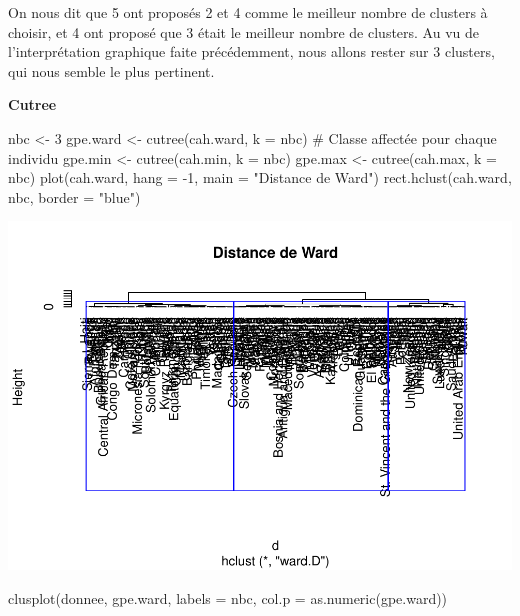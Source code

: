 \documentclass[
]{article}
\newenvironment{Shaded}{}{}
\newcommand{\AttributeTok}[1]{#1}
\newcommand{\CommentTok}[1]{\textcolor[rgb]{0.00,0.50,0.00}{#1}}
\newcommand{\DecValTok}[1]{#1}
\newcommand{\FunctionTok}[1]{#1}
\newcommand{\NormalTok}[1]{#1}
\newcommand{\OtherTok}[1]{\textcolor[rgb]{1.00,0.25,0.00}{#1}}
\newcommand{\SpecialCharTok}[1]{\textcolor[rgb]{0.00,0.50,0.50}{#1}}
\newcommand{\StringTok}[1]{\textcolor[rgb]{0.00,0.50,0.50}{#1}}
\begin{document}
On nous dit que 5 ont proposés 2 et 4 comme le meilleur nombre de
clusters à choisir, et 4 ont proposé que 3 était le meilleur nombre de
clusters. Au vu de l'interprétation graphique faite précédemment, nous
allons rester sur 3 clusters, qui nous semble le plus pertinent.

\textbf{Cutree}

\begin{Shaded}
\begin{Highlighting}[]
\NormalTok{nbc }\OtherTok{\textless{}{-}} \DecValTok{3}
\NormalTok{gpe.ward }\OtherTok{\textless{}{-}} \FunctionTok{cutree}\NormalTok{(cah.ward, }\AttributeTok{k =}\NormalTok{ nbc) }\CommentTok{\# Classe affectée pour chaque individu}
\NormalTok{gpe.min }\OtherTok{\textless{}{-}} \FunctionTok{cutree}\NormalTok{(cah.min, }\AttributeTok{k =}\NormalTok{ nbc)}
\NormalTok{gpe.max }\OtherTok{\textless{}{-}} \FunctionTok{cutree}\NormalTok{(cah.max, }\AttributeTok{k =}\NormalTok{ nbc)}
\FunctionTok{plot}\NormalTok{(cah.ward, }\AttributeTok{hang =} \SpecialCharTok{{-}}\DecValTok{1}\NormalTok{, }\AttributeTok{main =} \StringTok{"Distance de Ward"}\NormalTok{)}
\FunctionTok{rect.hclust}\NormalTok{(cah.ward, nbc, }\AttributeTok{border =} \StringTok{"blue"}\NormalTok{)}
\end{Highlighting}
\end{Shaded}

\includegraphics{Projet_files/figure-latex/unnamed-chunk-20-1.pdf}

\begin{Shaded}
\begin{Highlighting}[]
\FunctionTok{clusplot}\NormalTok{(donnee, gpe.ward, }\AttributeTok{labels =}\NormalTok{ nbc, }\AttributeTok{col.p =} \FunctionTok{as.numeric}\NormalTok{(gpe.ward))}
\end{Highlighting}
\end{Shaded}
\end{document}
